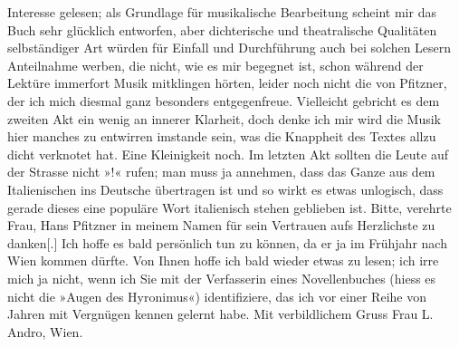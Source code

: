 \begin{ledgroupsized}[t]{13cm}
               Interesse gelesen; als Grundlage für musikalische Bearbeitung scheint mir das Buch sehr glücklich entworfen,
               aber  dichterische und theatralische Qualitäten
               selbständiger Art würden für Einfall und Durchführung auch bei solchen Lesern
               Anteilnahme werben, die nicht, wie es mir begegnet ist, schon während der Lektüre
               immerfort Musik mitklingen hörten, leider noch nicht die von Pfitzner, der ich mich diesmal ganz besonders entgegenfreue.
               Vielleicht gebricht es dem zweiten
                  Akt ein wenig an innerer Klarheit, doch denke ich mir wird die Musik hier
               manches zu entwirren imstande sein, was die Knappheit des Textes allzu dicht
               verknotet hat. Eine Kleinigkeit noch. Im letzten Akt sollten die Leute auf der Strasse nicht »\label{K_L02574-1v}\label{K_L02574-1h}!« rufen; man muss ja
               annehmen, dass das Ganze aus dem Italienischen
               ins Deutsche über{\pb}tragen ist und so wirkt es etwas unlogisch,
               dass gerade dieses eine populäre Wort italienisch stehen geblieben ist.\pend
           \pstart
           Bitte, verehrte Frau, Hans Pfitzner in meinem
               Namen für sein Vertrauen aufs Herzlichste zu danken{[}.{]} Ich hoffe
               es bald persönlich tun zu können, da er ja im Frühjahr nach Wien kommen dürfte. Von Ihnen hoffe ich bald wieder etwas zu
               lesen; ich irre mich ja nicht, wenn ich Sie mit der Verfasserin eines Novellenbuches
               (hiess es nicht die »Augen des Hyronimus«) identifiziere, das ich vor einer Reihe von Jahren mit
               Vergnügen kennen gelernt habe.\pend
           \pstart Mit verbildlichem Gruss\pend{}{\bigskip}\pstart
           \noindent{}Frau L. Andro, Wien.\pend
           

\end{ledgroupsized}
